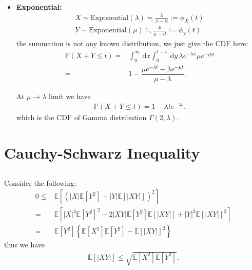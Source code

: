 \documentclass[11pt,a4paper]{article}
\numberwithin{equation}{section}%
\begin{document}
\begin{itemize}[topsep=2pt,itemsep=0pt]
\begin{align*}
    \end{align*}
    \item \textbf{Exponential:}
    \begin{align*}
        X\sim \mathrm{ Exponential }(\lambda )\fallingdotseq \frac{\lambda}{\lambda-it} := \phi _X(t)\\
        Y\sim \mathrm{ Exponential }(\mu )\fallingdotseq \frac{\mu}{\mu-it} := \phi _Y(t)
    \end{align*}
    the summation is not any known distribution, we just give the CDF here:
    \begin{align*}
        \mathbb{P}\left( X+Y\leq t \right) =& \int_0^\infty \,\mathrm{d}x \int_0^{t-x} \,\mathrm{d}y\, \lambda e^{-\lambda x}\mu e^{-\mu y}\\
        =& 1-\dfrac{ \mu e^{-\lambda t} - \lambda e^{-\mu t}}{\mu -\lambda }.
    \end{align*}

    At $ \mu \to\lambda  $ limit we have
    \begin{align*}
        \mathbb{P}\left( X+Y\leq t \right) = 1-\lambda te^{-\lambda t}. 
    \end{align*}
    which is the CDF of Gamma distribution $ \Gamma (2,\lambda ) $.
    
\end{itemize}




\section{Cauchy-Schwarz Inequality}
\subsection{}
Consider the following:
\begin{align*}
    0\leq &\mathbb{E}\left[  \left( \left\vert X \right\vert  \mathbb{E}\left[ Y^2 \right] - \left\vert Y \right\vert \mathbb{E}\left[ \left\vert XY \right\vert  \right]    \right)^2  \right]  \\
    =& \mathbb{E}\left[ \left\vert X \right\vert ^2 \mathbb{E}\left[ Y^2 \right]^2 -2\left\vert XY \right\vert \mathbb{E}\left[ Y^2 \right] \mathbb{E}\left[ \left\vert XY \right\vert  \right] + \left\vert Y \right\vert ^2 \mathbb{E}\left[ \left\vert XY \right\vert  \right]^2   \right] \\
    =&\mathbb{E}\left[ Y^2 \right]\left\{  \mathbb{E}\left[ X^2 \right] \mathbb{E}\left[ Y^2 \right] -  \mathbb{E}\left[ \left\vert XY \right\vert   \right]^2    \right\} 
\end{align*}
thus we have
\begin{align*}
    \mathbb{E}\left[ \left\vert XY \right\vert  \right] \leq \sqrt{\mathbb{E}\left[ X^2 \right] \mathbb{E}\left[ Y^2 \right] }.
\end{align*}
\end{document}
